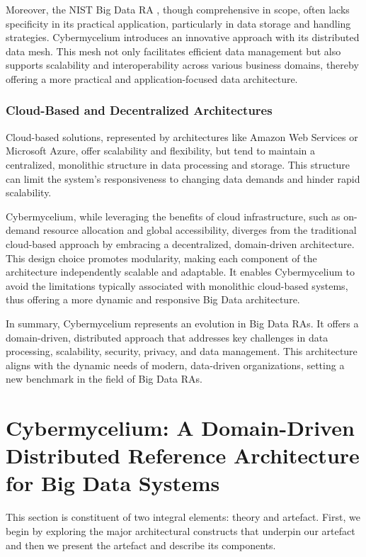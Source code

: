 \documentclass[review]{elsarticle}
\begin{document}
Moreover, the NIST Big Data RA \cite{Chang}, though comprehensive in scope, often lacks specificity in its practical application, particularly in data storage and handling strategies. Cybermycelium introduces an innovative approach with its distributed data mesh. This mesh not only facilitates efficient data management but also supports scalability and interoperability across various business domains, thereby offering a more practical and application-focused data architecture.

\subsubsection{Cloud-Based and Decentralized Architectures}
Cloud-based solutions, represented by architectures like Amazon Web Services or Microsoft Azure, offer scalability and flexibility, but tend to maintain a centralized, monolithic structure in data processing and storage. This structure can limit the system's responsiveness to changing data demands and hinder rapid scalability. 

Cybermycelium, while leveraging the benefits of cloud infrastructure, such as on-demand resource allocation and global accessibility, diverges from the traditional cloud-based approach by embracing a decentralized, domain-driven architecture. This design choice promotes modularity, making each component of the architecture independently scalable and adaptable. It enables Cybermycelium to avoid the limitations typically associated with monolithic cloud-based systems, thus offering a more dynamic and responsive Big Data architecture.


In summary, Cybermycelium represents an evolution in Big Data RAs. It offers a domain-driven, distributed approach that addresses key challenges in data processing, scalability, security, privacy, and data management. This architecture aligns with the dynamic needs of modern, data-driven organizations, setting a new benchmark in the field of Big Data RAs.


\section{Cybermycelium: A Domain-Driven Distributed Reference Architecture for Big Data Systems} \label{artifact-section}

This section is constituent of two integral elements: theory and artefact. First, we begin by exploring the major architectural constructs that underpin our artefact and then we present the artefact and describe its components.
\end{document}
